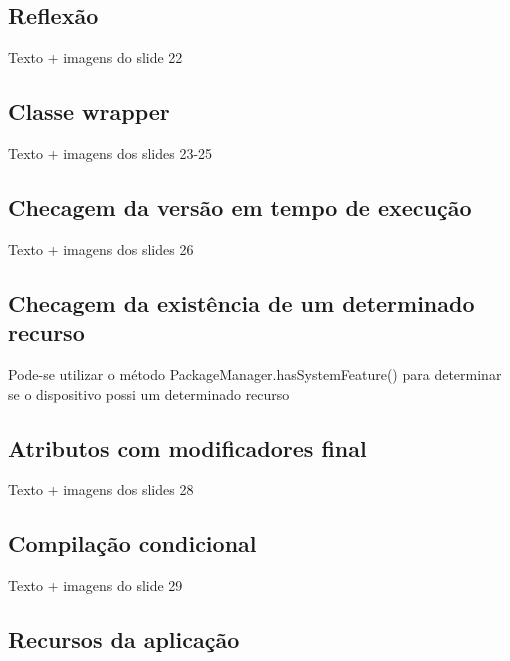 \documentclass[a4paper,12pt]{report}
\begin{document}
\subsection{Reflexão}

Texto + imagens do slide 22

\subsection{Classe wrapper}

Texto + imagens dos slides 23-25

\subsection{Checagem da versão em tempo de execução}

Texto + imagens dos slides 26

\subsection{Checagem da existência de um determinado recurso}
Pode-se utilizar o método PackageManager.hasSystemFeature() para determinar se o 
dispositivo possi um determinado recurso

\subsection{Atributos com modificadores final}

Texto + imagens dos slides 28


\subsection{Compilação condicional}

Texto + imagens do slide 29


\subsection{Recursos da aplicação}
\end{document}

